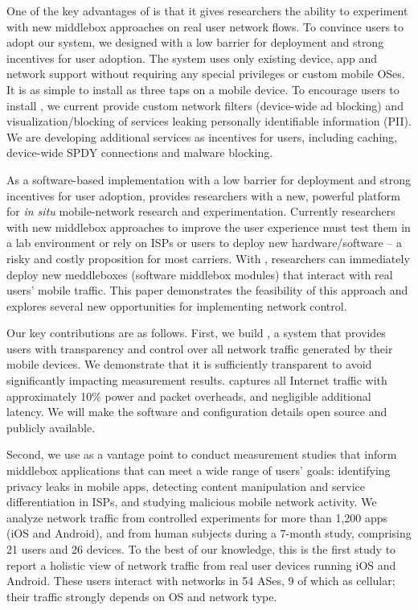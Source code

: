 One of the key advantages of \meddle is that it gives researchers the ability to experiment 
with new middlebox approaches on real user network flows. To convince users to adopt our 
system, we designed \meddle with a low barrier for deployment and strong incentives for 
user adoption. The system uses only existing device, app and network support without requiring 
any special privileges or custom mobile OSes. It is as simple to install as three taps 
on a mobile device. To encourage users to install \meddle, we current provide custom 
network filters (\eg device-wide ad blocking) and visualization/blocking of services leaking 
personally identifiable information (PII). We are developing additional services as incentives 
for users, including caching, device-wide SPDY connections and malware blocking.

As a software-based implementation with a low barrier for deployment and strong incentives for 
user adoption, \meddle provides researchers with a new, powerful platform for \emph{in situ} 
mobile-network research and experimentation. Currently researchers with new  
middlebox approaches to improve the user experience must test them in a lab environment or 
rely on ISPs or users to deploy new hardware/software -- a risky and costly proposition for 
most carriers. With \meddle, researchers 
can immediately deploy new meddleboxes (software middlebox modules) that interact with 
real users' mobile traffic. %
This paper demonstrates the feasibility of this approach and explores several new opportunities 
for implementing network control.

Our key contributions are as follows. First, we build \meddle, a system that provides users with transparency 
and control %
over all network traffic generated by their 
mobile devices. We demonstrate that it is sufficiently transparent to avoid significantly impacting measurement results. 
\platname captures all Internet traffic with approximately 10\% power and packet overheads, and negligible additional latency. 
We will make the \platname software and configuration details open source and publicly available.

Second, we use \meddle as a vantage point to conduct measurement studies that inform 
middlebox applications that can meet a wide range of users' goals: identifying privacy leaks in mobile apps, detecting content 
manipulation and service differentiation in ISPs, and studying malicious mobile network activity. We analyze network traffic from controlled experiments for more than 1,200 apps (iOS and Android), 
and from human subjects during a 7-month study, comprising 21 users and 26 devices. To the best of our knowledge, this is the first study to report a holistic 
view of network traffic from real user devices running iOS and Android. These users interact with networks in 54 ASes, 9 of which as cellular; their traffic 
strongly depends on OS and network type.


